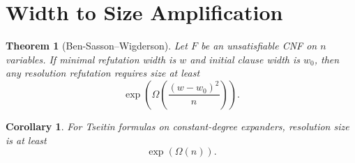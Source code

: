 \documentclass{article}
\newtheorem{theorem}{Theorem}
\newtheorem{corollary}{Corollary}
\begin{document}
\section{Width to Size Amplification}

\begin{theorem}[Ben-Sasson–Wigderson]
Let $F$ be an unsatisfiable CNF on $n$ variables.
If minimal refutation width is $w$ and initial clause width is $w_0$,
then any resolution refutation requires size at least
\[
\exp\!\left( \Omega\!\left(\frac{(w-w_0)^2}{n}\right) \right).
\]
\end{theorem}

\begin{corollary}
For Tseitin formulas on constant-degree expanders,
resolution size is at least
\[
\exp(\Omega(n)).
\]
\end{corollary}
\end{document}
